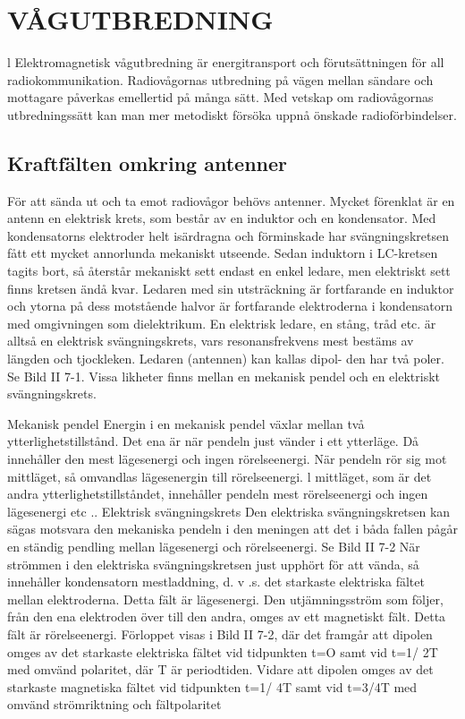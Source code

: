 \chapter{VÅGUTBREDNING}

l
Elektromagnetisk vågutbredning är energitransport och förutsättningen för all radiokommunikation. Radiovågornas utbredning
på vägen mellan sändare och mottagare
påverkas emellertid på många sätt. Med
vetskap om radiovågornas utbredningssätt
kan man mer metodiskt försöka uppnå önskade radioförbindelser.

\section{Kraftfälten omkring antenner}

För att sända ut och ta emot radiovågor
behövs antenner. Mycket förenklat är en
antenn en elektrisk krets, som består av en
induktor och en kondensator.
Med kondensatorns elektroder helt isärdragna och förminskade har svängningskretsen fått ett mycket annorlunda mekaniskt utseende. Sedan induktorn i LC-kretsen tagits bort, så återstår mekaniskt sett
endast en enkel ledare, men elektriskt sett
finns kretsen ändå kvar. Ledaren med sin
utsträckning är fortfarande en induktor och
ytorna på dess motstående halvor är fortfarande elektroderna i kondensatorn med omgivningen som dielektrikum.
En elektrisk ledare, en stång, tråd etc. är
alltså en elektrisk svängningskrets, vars resonansfrekvens mest bestäms av längden
och tjockleken. Ledaren (antennen) kan kallas dipol- den har två poler. Se Bild II 7-1.
Vissa likheter finns mellan en mekanisk
pendel och en elektriskt svängningskrets.

Mekanisk pendel
Energin i en mekanisk pendel växlar mellan
två ytterlighetstillstånd. Det ena är när pendeln just vänder i ett ytterläge. Då innehåller
den mest lägesenergi och ingen rörelseenergi. När pendeln rör sig mot mittläget, så
omvandlas lägesenergin till rörelseenergi. l
mittläget, som är det andra ytterlighetstillståndet, innehåller pendeln mest rörelseenergi och ingen lägesenergi etc ..
Elektrisk svängningskrets
Den elektriska svängningskretsen kan sägas motsvara den mekaniska pendeln i den
meningen att det i båda fallen pågår en
ständig pendling mellan lägesenergi och rörelseenergi. Se Bild II 7-2
När strömmen i den elektriska svängningskretsen just upphört för att vända, så
innehåller kondensatorn mestladdning, d. v .s.
det starkaste elektriska fältet mellan elektroderna. Detta fält är lägesenergi. Den utjämningsström som följer, från den ena elektroden över till den andra, omges av ett
magnetiskt fält. Detta fält är rörelseenergi.
Förloppet visas i Bild II 7-2, där det framgår att dipolen omges av det starkaste elektriska fältet vid tidpunkten t=O samt vid t=1/
2T med omvänd polaritet, där T är periodtiden. Vidare att dipolen omges av det starkaste magnetiska fältet vid tidpunkten t=1/
4T samt vid t=3/4T med omvänd strömriktning och fältpolaritet

